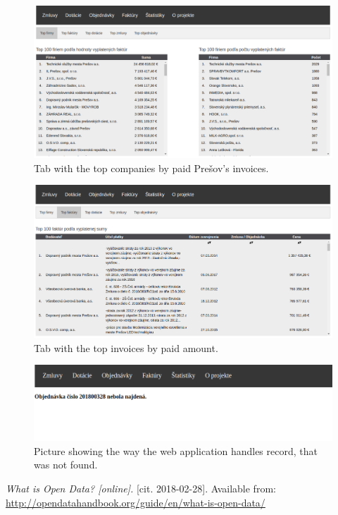 \documentclass[thesis=B,english]{FITthesis}[2012/06/26]
\begin{document}
{\begin{figure}[H]
  \begin{center}
  \includegraphics[scale=0.30]{pictures/statistics.png}
  \caption{Tab with the top companies by paid Prešov's invoices.}
    \label{fig:webapp-topcompanies}
  \end{center}
\end{figure}

\begin{figure}[H]
  \begin{center}
  \includegraphics[scale=0.30]{pictures/topInvoices.png}
  \caption{Tab with the top invoices by paid amount.}
    \label{fig:webapp-topinvoices}
  \end{center}
\end{figure}

\begin{figure}[H]
  \begin{center}
  \includegraphics[scale=0.35]{pictures/orderNotFound.png}
  \caption{Picture showing the way the web application handles record, that was not found.}
    \label{fig:webapp-contract-notfound}
  \end{center}
\end{figure}

\begin{thebibliography}{9}
\textit{What is Open Data? [online].}
[cit. 2018-02-28]. Available from: \url{http://opendatahandbook.org/guide/en/what-is-open-data/} 


\end{thebibliography}}
\end{document}
